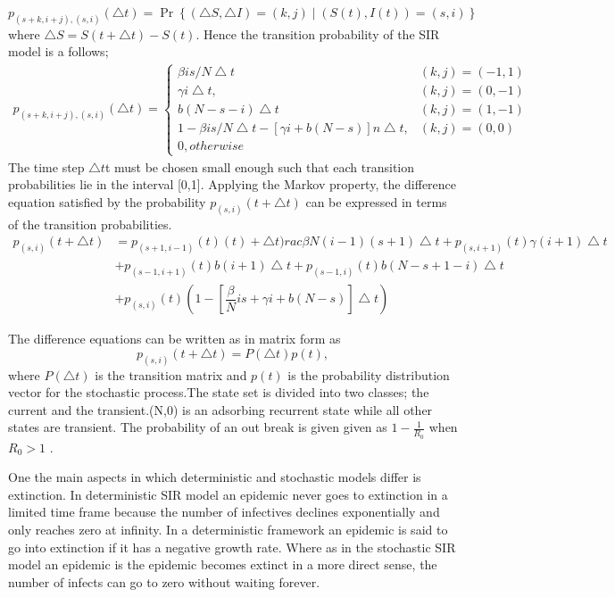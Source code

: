 \begin{equation}
p_{(s+k,i+j),(s,i)}(\bigtriangleup t )= \Pr \left\lbrace( \bigtriangleup S ,\bigtriangleup I) = (k,j)\mid (S(t), I(t)) = (s,i) \right\rbrace
\end{equation}
where $\bigtriangleup S = S(t + \bigtriangleup t) - S(t)$. Hence the transition probability of the SIR model is a follows;
\begin{align}
p_{(s+k,i+j),(s,i)}(\bigtriangleup t )= \left\lbrace \begin{array}{ll}
 \beta i s / N \bigtriangleup t & (k,j) = (-1,1)
 \\ \gamma i \bigtriangleup t, & (k,j) = (0,-1)
 \\ b (N- s -i)\bigtriangleup t & (k,j) = (1,-1)
 \\ 1 - \beta i s/N \bigtriangleup t - \left[\gamma i +b(N-s) \right]n\bigtriangleup t ,& (k,j) =(0,0)
 \\ 0, otherwise
 \end{array} \right.
\end{align}
The time step $\bigtriangleup t$t must be chosen small enough such that each transition probabilities lie in the interval [0,1]. Applying the Markov property, the difference equation satisfied by the probability $p_{(s,i)} (t +\bigtriangleup t)$ can be expressed in terms of the transition probabilities.
\begin{align*}
p_{(s,i)} (t + \bigtriangleup t) &= p_{(s+1, i-1)}(t) (t) +\bigtriangleup t)rac{\beta}{N}(i -1)(s +1) \bigtriangleup t + p _{(s,i+1)} (t) \gamma (i +1) \bigtriangleup t \\ &+ p_{(s-1,i+1)}(t) b(i+1) \bigtriangleup t + p_{(s-1,i)}(t)b(N-s+1- i) \bigtriangleup t  \\&
+  {p_(s,i)}(t) \left(1 - \left[\dfrac{\beta}{N} is + \gamma i + b(N-s) \right] \bigtriangleup t\right)
\end{align*}

The difference equations can be written as in matrix form as 
\begin{equation*}
p_{(s,i)}(t + \bigtriangleup t) = P (\bigtriangleup t)p(t),
\end{equation*}
where $P(\bigtriangleup t)$ is the transition matrix and $p(t)$ is the probability distribution vector for the stochastic process.The state set is divided into two classes; the current and the transient.(N,0) is an adsorbing recurrent state while all other states are transient. The probability of an out break is given given as $1- \frac{1}{R_0}$ when $R_0 >1$ \citep{Brauer2017}.

One the main aspects in which deterministic and stochastic models differ is extinction. In deterministic SIR model an epidemic never goes to extinction in a limited time frame  because the number of infectives declines exponentially and only reaches zero at infinity.  In a deterministic framework an epidemic is said to go into extinction if it has a negative growth rate. Where as in the stochastic SIR model an epidemic is the  epidemic becomes extinct in a more direct sense, the number of infects can go to zero without waiting forever.